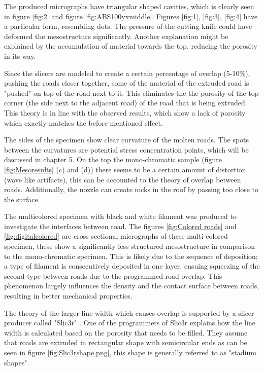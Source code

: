 The produced micrographs have triangular shaped cavities, which is clearly seen in figure \ref{fig:2} and figure \ref{fig:ABS100yxmiddle}. Figures \ref{fig:1}, \ref{fig:3}, \ref{fig:4} have a particular form, resembling dots. The pressure of the cutting knife could have deformed the mesostructure significantly. Another explanation might be explained by the accumulation of material towards the top, reducing the porosity in its way. 

Since the slicers are  modeled to create a certain percentage of overlap (5-10\%), pushing the roads closer together, some of the material of the extruded road is "pushed" on top of the road next to it. This eliminates the the porosity of the top corner (the side next to the adjacent road) of the road that is being extruded. This theory is in line with the observed results, which show a lack of porosity which exactly matches the before mentioned effect. 

The sides of the specimen show clear curvature of the molten roads. The spots between the curvatures are potential stress concentration points, which will be discussed in chapter 5.
On the top the mono-chromatic sample (figure \ref{fig:Mesoresults} (c) and (d)) there seems to be a certain amount of distortion (wave like artifacts), this can be accounted to the theory of overlap between roads. Additionally, the nozzle can create nicks in the roof by passing too close to the surface.

The multicolored specimen with black and white filament was produced to investigate the interfaces between road. The figures \ref{fig:Colored roads} and \ref{fig:digitalcolored} are cross sectional micrographs of these multi-colored specimen, these show a significantly less structured mesostructure in comparison to the mono-chromatic specimen. This is likely due to the sequence of deposition; a type of filament is consecutively deposited in one layer,  ensuing squeezing of the second type between roads due to the programmed road overlap. This phenomenon largely influences the density and the contact surface between roads, resulting in better mechanical properties.

The theory of the larger line width which causes overlap is supported by a slicer producer called "Slic3r" \cite{GaryHodgsonSlic3rMath}. One of the programmers of Slic3r explains how the line width is calculated based on the porosity that needs to be filled. They assume that roads are extruded in rectangular shape with  semicircular ends as can be seen in figure \ref{fig:Slic3rshape.png}, this shape is generally referred to as "stadium shapes".

